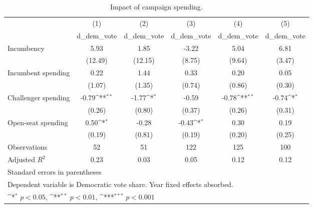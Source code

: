 \begin{table}[htbp]\centering
\def\sym#1{\ifmmode^{#1}\else\(^{#1}\)\fi}
\caption{Impact of campaign spending. \label{table:robustness}}
\begin{tabular}{l*{5}{c}}
\toprule
                    &\multicolumn{1}{c}{(1)}&\multicolumn{1}{c}{(2)}&\multicolumn{1}{c}{(3)}&\multicolumn{1}{c}{(4)}&\multicolumn{1}{c}{(5)}\\
                    &\multicolumn{1}{c}{d\_dem\_vote}&\multicolumn{1}{c}{d\_dem\_vote}&\multicolumn{1}{c}{d\_dem\_vote}&\multicolumn{1}{c}{d\_dem\_vote}&\multicolumn{1}{c}{d\_dem\_vote}\\
\midrule
Incumbency          &        5.93         &        1.85         &       -3.22         &        5.04         &        6.81         \\
                    &     (12.49)         &     (12.15)         &      (8.75)         &      (9.64)         &      (3.47)         \\
\addlinespace
Incumbent spending  &        0.22         &        1.44         &        0.33         &        0.20         &        0.05         \\
                    &      (1.07)         &      (1.35)         &      (0.74)         &      (0.86)         &      (0.30)         \\
\addlinespace
Challenger spending &       -0.79\sym{**} &       -1.77\sym{*}  &       -0.59         &       -0.78\sym{**} &       -0.74\sym{*}  \\
                    &      (0.26)         &      (0.80)         &      (0.37)         &      (0.26)         &      (0.31)         \\
\addlinespace
Open-seat spending  &        0.50\sym{*}  &       -0.28         &       -0.43\sym{*}  &        0.30         &        0.19         \\
                    &      (0.19)         &      (0.81)         &      (0.19)         &      (0.20)         &      (0.25)         \\
\midrule
Observations        &          52         &          51         &         122         &         125         &         100         \\
Adjusted \(R^{2}\)  &        0.23         &        0.03         &        0.05         &        0.12         &        0.12         \\
\bottomrule
\multicolumn{6}{l}{\footnotesize Standard errors in parentheses}\\
\multicolumn{6}{l}{\footnotesize Dependent variable is Democratic vote share. Year fixed effects absorbed.}\\
\multicolumn{6}{l}{\footnotesize \sym{*} \(p<0.05\), \sym{**} \(p<0.01\), \sym{***} \(p<0.001\)}\\
\end{tabular}
\end{table}
